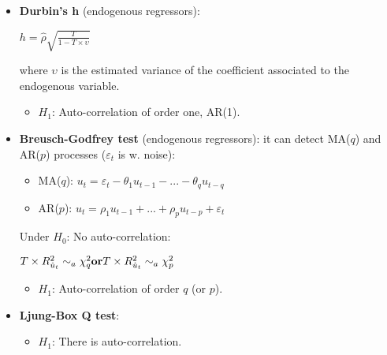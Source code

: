 \documentclass[10pt, a4paper, landscape]{extarticle}
\begin{document}
\begin{multicols}{3}
\begin{itemize}[leftmargin=*]
\begin{itemize}[leftmargin=*]
\begin{center}
				\end{center}
				\item \textbf{Durbin's h} (endogenous regressors):
				\begin{center}
					$h = \hat{\rho} \sqrt{\frac{T}{1 - T \times \upsilon}}$
				\end{center}
				where $\upsilon$ is the estimated variance of the coefficient associated to the endogenous variable.
				\begin{itemize}[leftmargin=*]
					\item $H_1$: Auto-correlation of order one, AR(1).
				\end{itemize}
				\item \textbf{Breusch-Godfrey test} (endogenous regressors): it can detect MA($q$) and AR($p$) processes ($\varepsilon_t$ is w. noise):
				\begin{itemize}[leftmargin=*]
					\item MA($q$): $u_t = \varepsilon_t - \theta_1 u_{t-1} - ... - \theta_q u_{t-q}$
					\item AR($p$): $u_t = \rho_1 u_{t-1} + ... + \rho_p u_{t-p} + \varepsilon_t$
				\end{itemize}
				Under $H_0$: No auto-correlation:
				\begin{center}
					$\hfill T \times R^2_{\hat{u}_t} \sim_a \chi^2_q \hfill \textbf{or} \hfill T \times R^2_{\hat{u}_t} \sim_a \chi^2_p \hfill$
				\end{center}
				\begin{itemize}[leftmargin=*]
					\item $H_1$: Auto-correlation of order $q$ (or $p$).
				\end{itemize}
				\item \textbf{Ljung-Box Q test}:
				\begin{itemize}[leftmargin=*]
					\item $H_1$: There is auto-correlation.
				\end{itemize}
			\end{itemize}
		\end{itemize}

\end{multicols}
\end{document}
